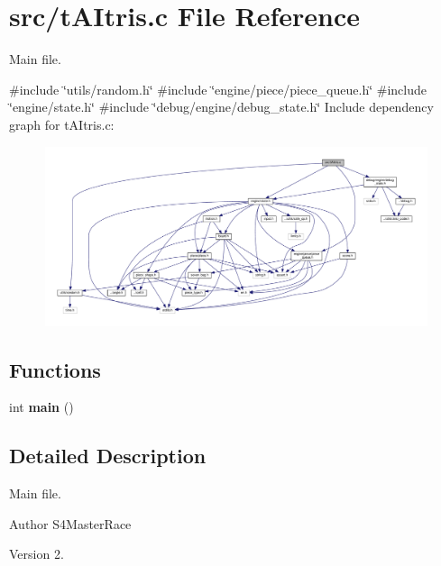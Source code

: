 \section{src/t\+A\+Itris.c File Reference}
\label{tAItris_8c}


Main file.  


{\ttfamily \#include \char`\"{}utils/random.\+h\char`\"{}}\newline
{\ttfamily \#include \char`\"{}engine/piece/piece\+\_\+queue.\+h\char`\"{}}\newline
{\ttfamily \#include \char`\"{}engine/state.\+h\char`\"{}}\newline
{\ttfamily \#include \char`\"{}debug/engine/debug\+\_\+state.\+h\char`\"{}}\newline
Include dependency graph for t\+A\+Itris.\+c\+:
\nopagebreak
\begin{figure}[H]
\begin{center}
\leavevmode
\includegraphics[width=350pt]{tAItris_8c__incl}
\end{center}
\end{figure}
\subsection*{Functions}
\begin{DoxyCompactItemize}
\item 
int \textbf{ main} ()
\end{DoxyCompactItemize}


\subsection{Detailed Description}
Main file. 

\begin{DoxyAuthor}{Author}
S4\+Master\+Race 
\end{DoxyAuthor}
\begin{DoxyVersion}{Version}
2. 
\end{DoxyVersion}


